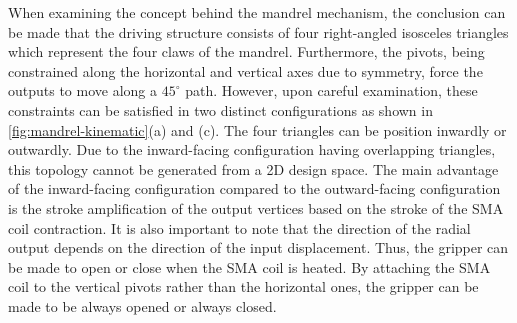 When examining the concept behind the mandrel mechanism, the conclusion can be made that the driving structure consists of four right-angled isosceles triangles which represent the four claws of the mandrel. Furthermore, the pivots, being constrained along the horizontal and vertical axes due to symmetry, force the outputs to move along a $45^{\circ}$ path. However, upon careful examination, these constraints can be satisfied in two distinct configurations as shown in \cref{fig:mandrel-kinematic}(a) and (c). The four triangles can be position inwardly or outwardly. Due to the inward-facing configuration having overlapping triangles, this topology cannot be generated from a 2D design space. The main advantage of the inward-facing configuration compared to the outward-facing configuration is the stroke amplification of the output vertices based on the stroke of the SMA coil contraction. It is also important to note that the direction of the radial output depends on the direction of the input displacement. Thus, the gripper can be made to open or close when the SMA coil is heated. By attaching the SMA coil to the vertical pivots rather than the horizontal ones, the gripper can be made to be always opened or always closed.


